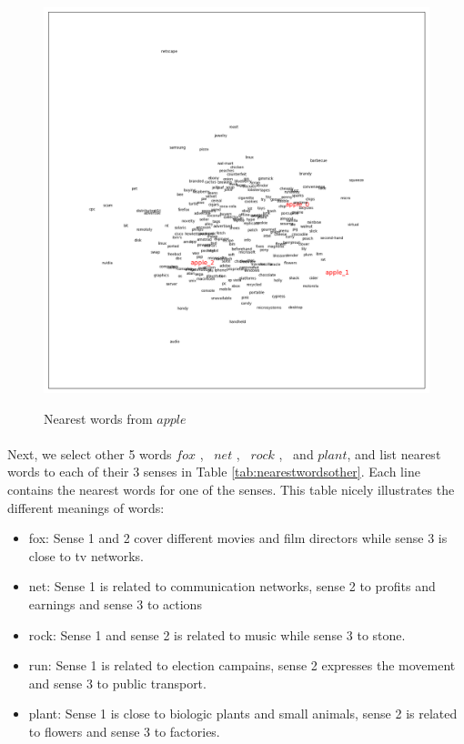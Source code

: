 \begin{figure}[tb]
	\caption{Nearest words from $apple$}
  \centering
	\includegraphics[width=1.0\textwidth]{apple} 
	\label{fig:apple}
\end{figure}

\clearpage %

\paragraph{} Next, we select other 5 words $fox$ , \ $net$ , \ $rock$ , \ and $plant$, and list nearest words to each of their 3 senses in Table \ref{tab:nearestwordsother}. Each line contains the nearest words for one of the senses. This table nicely illustrates the different meanings of words: 
\begin{itemize}
	\item fox: Sense 1 and 2 cover different movies and film directors while sense 3 is close to tv networks.
	\item net: Sense 1 is related to communication networks, sense 2 to profits and earnings and sense 3 to actions
	\item rock: Sense 1 and sense 2 is related to music while sense 3 to stone.
	\item run: Sense 1 is related to election campains, sense 2 expresses the movement and sense 3 to public transport.
	\item plant: Sense 1 is close to biologic plants and small animals, sense 2 is related to flowers and sense 3 to factories.
\end{itemize}


